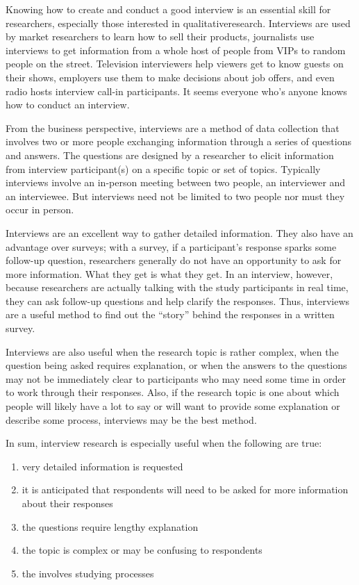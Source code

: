 Knowing how to create and conduct a good interview is an essential skill for researchers, especially those interested in \gls{qualitativeresearch}. Interviews are used by market researchers to learn how to sell their products, journalists use interviews to get information from a whole host of people from VIPs to random people on the street. Television interviewers help viewers get to know guests on their shows, employers use them to make decisions about job offers, and even radio hosts interview call-in participants. It seems everyone who's anyone knows how to conduct an interview.

From the business perspective, interviews are a method of data collection that involves two or more people exchanging information through a series of questions and answers. The questions are designed by a researcher to elicit information from interview participant(s) on a specific topic or set of topics. Typically interviews involve an in-person meeting between two people, an interviewer and an interviewee. But interviews need not be limited to two people nor must they occur in person.

Interviews are an excellent way to gather detailed information. They also have an advantage over surveys; with a survey, if a participant's response sparks some follow-up question, researchers generally do not have an opportunity to ask for more information. What they get is what they get. In an interview, however, because researchers are actually talking with the study participants in real time, they can ask follow-up questions and help clarify the responses. Thus, interviews are a useful method to find out the ``story'' behind the responses in a written survey.

Interviews are also useful when the research topic is rather complex, when the question being asked requires explanation, or when the answers to the questions may not be immediately clear to participants who may need some time in order to work through their responses. Also, if the research topic is one about which people will likely have a lot to say or will want to provide some explanation or describe some process, interviews may be the best method. 

In sum, interview research is especially useful when the following are true:

\begin{enumerate}
	\item very detailed information is requested
	\item it is anticipated that respondents will need to be asked for more information about their responses
	\item the questions require lengthy explanation
	\item the topic is complex or may be confusing to respondents
	\item the involves studying processes
\end{enumerate}

